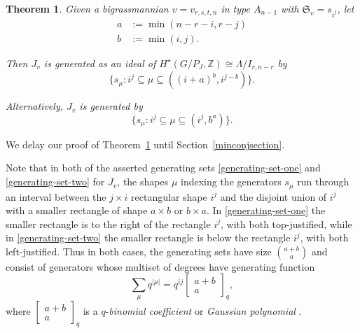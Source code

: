 \documentclass[12pt,dvips]{amsart}
\theoremstyle{plain}
\newtheorem{theorem}{Theorem}[section]
\theoremstyle{definition}
\theoremstyle{remark}
\numberwithin{equation}{section}
\def\schubp{\mathfrak{S}}
\newcommand{\qbin}[2]{\left[ \begin{matrix} #1 \\ #2 \end{matrix} \right]_q}
\begin{document}
\begin{theorem}
\label{J-generators}
  Given a bigrassmannian $v=v_{r,s,t,n}$ in type $A_{n-1}$ with $\schubp_v = s_{i^j}$, let
$$
\begin{aligned}
a&:=\min(n-r-i,r-j)\\
b&:=\min(i,j).
\end{aligned}
$$

Then $J_v$ is generated as an ideal of 
$H^{\star}(G/P_J, {\mathbb Z})\cong \Lambda/I_{r,n-r}$ by 
\begin{equation}
\label{generating-set-one}
\{ s_{\mu}: i^j \subseteq \mu \subseteq ((i+a)^b,i^{j-b}) \}.
\end{equation}

Alternatively, $J_v$ is generated by 
\begin{equation}
\label{generating-set-two}
\{ s_{\mu}: i^j \subseteq \mu \subseteq (i^j,b^a) \}.
\end{equation}
\end{theorem}

We delay our proof of Theorem~\ref{J-generators} until Section~\ref{minconjsection}.

\noindent
Note that in both of the asserted generating sets \eqref{generating-set-one} and \eqref{generating-set-two} for $J_v$,
the shapes $\mu$ indexing the generators $s_\mu$ run through an interval between
the $j \times i$ rectangular shape $i^j$ and the disjoint union of $i^j$ with a 
smaller rectangle of shape $a \times b$ or $b \times a$. 
In \eqref{generating-set-one} the smaller rectangle is to the right
of the rectangle $i^j$, with both top-justified, while in \eqref{generating-set-two} the 
smaller rectangle is below the rectangle $i^j$, with both left-justified.  
Thus in both cases, the generating sets have size $\binom{a+b}{a}$
and consist of generators whose multiset of degrees
have generating function 
$$
\sum_\mu q^{|\mu|} = q^{ij} \qbin{a+b}{a},
$$
where $\qbin{a+b}{a}$ is a $q$-{\it binomial coefficient} or {\it Gaussian polynomial} 
\cite[I.2 Exer. 3]{Macdonald}.
\end{document}
